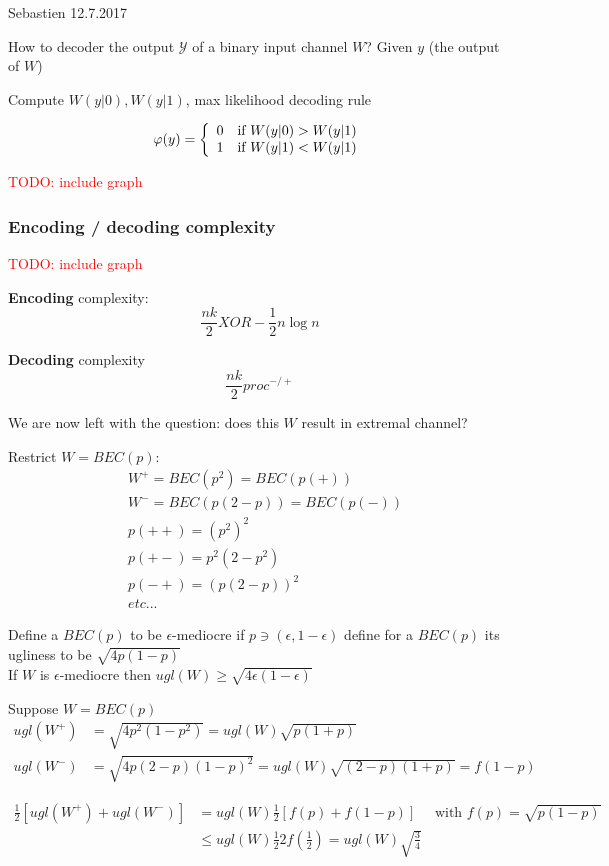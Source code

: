 \documentclass{article}
\theoremstyle{definition} %
\newcommand{\todo}[1]{\textcolor{red}{TODO: #1}}
\def\Y{\mathcal{Y}}
\begin{document}
  Sebastien 12.7.2017

How to decoder the output $\Y$ of a binary input channel $W$? Given $y$ (the output of $W$)

Compute $W(y|0), W(y|1)$, max likelihood decoding rule

\[
\varphi(y) = 
\left\{
\begin{array}{c c}
  0 & \text{if } W(y|0) > W(y|1) \\
  1 & \text{if } W(y|1) < W(y|1) \\
\end{array}
\right.
\]

\todo{include graph}

\subsubsection*{Encoding / decoding complexity}

\todo{include graph}

\textbf{Encoding} complexity:
\[ 
  \frac{nk}{2} XOR - \frac{1}{2} n \log n
\]

\textbf{Decoding} complexity
\[
  \frac{nk}{2} proc^{-/+}
\]

We are now left with the question: does this $W$ result in extremal channel?

Restrict $W = BEC(p)$: 
\begin{align*}
  & W^+ = BEC(p^2) = BEC(p(+)) \\
  & W^- = BEC(p(2-p)) = BEC(p(-)) \\
  & p(++) = (p^2)^2 \\
  & p(+-) = p^2 (2 - p^2) \\
  & p(-+) = (p(2-p))^2 \\
  & etc...
\end{align*}

Define a $BEC(p)$ to be $\epsilon$-mediocre if $p \ni (\epsilon, 1-\epsilon)$ define for a $BEC(p)$ its ugliness to be $\sqrt{4 p(1-p)}$ \\
If $W$ is $\epsilon$-mediocre then $ugl(W) \geq \sqrt{4 \epsilon ( 1 - \epsilon)}$

Suppose $W = BEC(p)$
\begin{align*}
  ugl(W^+) &= \sqrt{4 p^2 (1-p^2)}    = ugl(W) \sqrt{p (1+p)} \\
  ugl(W^-) &= \sqrt{4 p (2-p)(1-p)^2} = ugl(W) \sqrt{(2-p)(1+p)} = f(1-p) 
\end{align*}

\begin{align*}
  \frac{1}{2} [ugl(W^+) + ugl(W^-)] &= ugl(W) \frac{1}{2} [f(p) + f(1-p)] \quad \text{ with } f(p) = \sqrt{p(1-p)} \\
    &\leq ugl(W) \frac{1}{2} 2 f(\frac{1}{2}) = ugl(W) \sqrt{\frac{3}{4}}
\end{align*}
\end{document}
